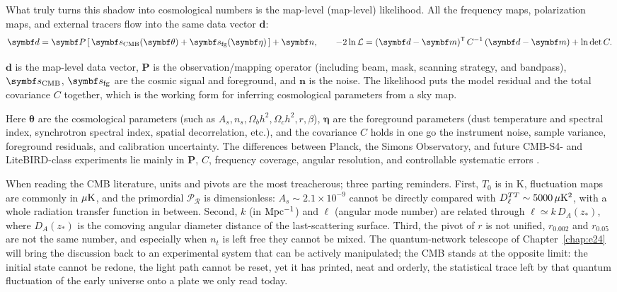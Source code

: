 What truly turns this shadow into cosmological numbers is the map-level (map-level) likelihood. All the frequency maps, polarization maps, and external tracers flow into the same data vector \(\bm d\):
\begin{equation}
  \bm d=\bm P\,[\,\bm s_{\rm CMB}(\bm\theta)+\bm s_{\rm fg}(\bm\eta)\,]+\bm n,
  \qquad
  -2\ln\mathcal L=(\bm d-\bm m)^{\mathsf T}\,C^{-1}\,(\bm d-\bm m)+\ln\det C .
  \label{eq:e23-cmb-likelihood}
\end{equation}
\begin{formulaexplain}
\(\bm d\) is the map-level data vector, \(\bm P\) is the observation/mapping operator (including beam, mask, scanning strategy, and bandpass), \(\bm s_{\rm CMB}\), \(\bm s_{\rm fg}\) are the cosmic signal and foreground, and \(\bm n\) is the noise. The likelihood puts the model residual and the total covariance \(C\) together, which is the working form for inferring cosmological parameters from a sky map.
\end{formulaexplain}
Here \(\bm\theta\) are the cosmological parameters (such as \(A_s,n_s,\Omega_bh^2,\Omega_ch^2,r,\beta\)), \(\bm\eta\) are the foreground parameters (dust temperature and spectral index, synchrotron spectral index, spatial decorrelation, etc.), and the covariance \(C\) holds in one go the instrument noise, sample variance, foreground residuals, and calibration uncertainty. The differences between Planck, the Simons Observatory, and future CMB-S4- and LiteBIRD-class experiments lie mainly in \(\bm P\), \(C\), frequency coverage, angular resolution, and controllable systematic errors \citep{2016A&A...594A..13P,2016A&A...594A..20P,2017MNRAS.472.1195C,2019JCAP...02..056A,2020A&A...641A...6P}.

When reading the CMB literature, units and pivots are the most treacherous; three parting reminders. First, \(T_0\) is in K, fluctuation maps are commonly in \(\mu{\rm K}\), and the primordial \(\mathcal P_{\mathcal R}\) is dimensionless: \(A_s\sim2.1\times10^{-9}\) cannot be directly compared with \(D_\ell^{TT}\sim5000\,\mu{\rm K}^2\), with a whole radiation transfer function in between. Second, \(k\) (in \({\rm Mpc^{-1}}\)) and \(\ell\) (angular mode number) are related through \(\ell\simeq k\,D_A(z_*)\), where \(D_A(z_*)\) is the comoving angular diameter distance of the last-scattering surface. Third, the pivot of \(r\) is not unified, \(r_{0.002}\) and \(r_{0.05}\) are not the same number, and especially when \(n_t\) is left free they cannot be mixed. The quantum-network telescope of Chapter~\ref{chap:e24} will bring the discussion back to an experimental system that can be actively manipulated; the CMB stands at the opposite limit: the initial state cannot be redone, the light path cannot be reset, yet it has printed, neat and orderly, the statistical trace left by that quantum fluctuation of the early universe onto a plate we only read today.

